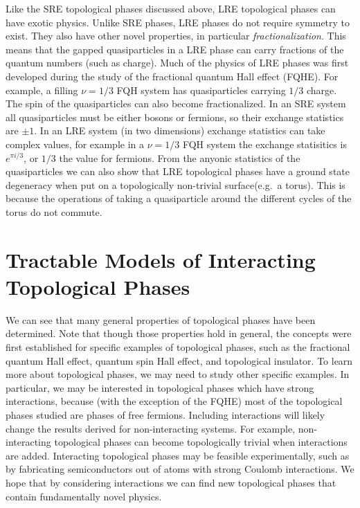 Like the SRE topological phases discussed above, LRE topological phases can have exotic physics. Unlike SRE phases, LRE phases do not require symmetry to exist. They also have other novel properties, in particular \emph{fractionalization}. This means that the gapped quasiparticles in a LRE phase can carry fractions of the quantum numbers (such as charge). Much of the physics of LRE phases was first developed during the study of the fractional quantum Hall effect (FQHE).\cite{Wen_book} For example, a filling $\nu=1/3$ FQH system has quasiparticles carrying $1/3$ charge\cite{Laughlin-PhysRevLett.50.1395}. The spin of the quasiparticles can also become fractionalized. In an SRE system all quasiparticles must be either bosons or fermions, so their exchange statistics are $\pm 1$. 
In an LRE system (in two dimensions) exchange statistics can take complex values, for example in a $\nu=1/3$ FQH system the exchange statisitics is $e^{\pi i/3}$, or $1/3$ the value for fermions.
From the anyonic statistics of the quasiparticles we can also show that LRE topological phases have a ground state degeneracy when put on a topologically non-trivial surface(e.g.~a torus). This is because the operations of taking a quasiparticle around the different cycles of the torus do not commute.


\section{Tractable Models of Interacting Topological Phases}

	We can see that many general properties of topological phases have been determined. Note that though those properties hold in general, the concepts were first established for specific examples of topological phases, such as the fractional quantum Hall effect, quantum spin Hall effect, and topological insulator. To learn more about topological phases, we may need to study other specific examples. In particular, we may be interested in topological phases which have strong interactions, because (with the exception of the FQHE) most of the topological phases studied are phases of free fermions.
Including interactions will likely change the results derived for non-interacting systems. For example, non-interacting topological phases can become topologically trivial when interactions are added\cite{FidkowskiKitaev2011}. Interacting topological phases may be feasible experimentally, such as by fabricating semiconductors out of atoms with strong Coulomb interactions\cite{WangSenthil2014}. 
We hope that by considering interactions we can find new topological phases that contain fundamentally novel physics. 

